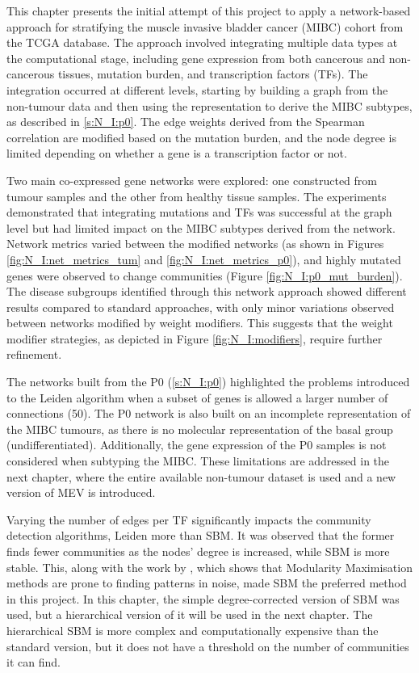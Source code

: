 This chapter presents the initial attempt of this project to apply a network-based approach for stratifying the muscle invasive bladder cancer (MIBC) cohort from the TCGA database. The approach involved integrating multiple data types at the computational stage, including gene expression from both cancerous and non-cancerous tissues, mutation burden, and transcription factors (TFs). The integration occurred at different levels, starting by building a graph from the non-tumour data and then using the representation to derive the MIBC subtypes, as described in \cref{s:N_I:p0}. The edge weights derived from the Spearman correlation are modified based on the mutation burden, and the node degree is limited depending on whether a gene is a transcription factor or not.



Two main co-expressed gene networks were explored: one constructed from tumour samples and the other from healthy tissue samples. The experiments demonstrated that integrating mutations and TFs was successful at the graph level but had limited impact on the MIBC subtypes derived from the network. Network metrics varied between the modified networks (as shown in Figures \ref{fig:N_I:net_metrics_tum} and \ref{fig:N_I:net_metrics_p0}), and highly mutated genes were observed to change communities (Figure \ref{fig:N_I:p0_mut_burden}). The disease subgroups identified through this network approach showed different results compared to standard approaches, with only minor variations observed between networks modified by weight modifiers. This suggests that the weight modifier strategies, as depicted in Figure \ref{fig:N_I:modifiers}, require further refinement.

The networks built from the P0 (\cref{s:N_I:p0}) highlighted the problems introduced to the Leiden algorithm when a subset of genes is allowed a larger number of connections (50). The P0 network is also built on an incomplete representation of the MIBC tumours, as there is no molecular representation of the basal group (undifferentiated). Additionally, the gene expression of the P0 samples is not considered when subtyping the MIBC. These limitations are addressed in the next chapter, where the entire available non-tumour dataset is used and a new version of MEV is introduced.


Varying the number of edges per TF significantly impacts the community detection algorithms, Leiden more than SBM. It was observed that the former finds fewer communities as the nodes' degree is increased, while SBM is more stable. This, along with the work by \citet{Peixoto2021-jx, Peixoto2023-rt}, which shows that Modularity Maximisation methods are prone to finding patterns in noise, made SBM the preferred method in this project. In this chapter, the simple degree-corrected version of SBM was used, but a hierarchical version of it will be used in the next chapter. The hierarchical SBM is more complex and computationally expensive than the standard version, but it does not have a threshold on the number of communities it can find.



